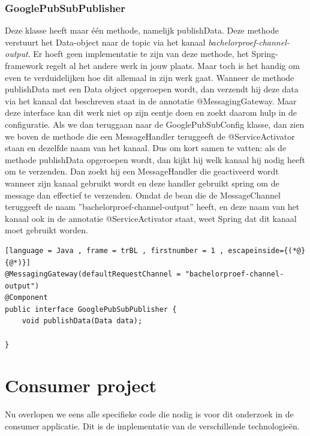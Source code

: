 \subsubsection{GooglePubSubPublisher}
Deze klasse heeft maar één methode, namelijk publishData. Deze methode verstuurt het Data-object naar de topic via het kanaal \emph{bachelorproef-channel-output}. Er hoeft geen implementatie te zijn van deze methode, het Spring-framework regelt al het andere werk in jouw plaats. Maar toch is het handig om even te verduidelijken hoe dit allemaal in zijn werk gaat. Wanneer de methode publishData met een Data object opgeroepen wordt, dan verzendt hij deze data via het kanaal dat beschreven staat in de annotatie @MessagingGateway. Maar deze interface kan dit werk niet op zijn eentje doen en zoekt daarom hulp in de configuratie. Als we dan teruggaan naar de GooglePubSubConfig klasse, dan zien we boven de methode die een MessageHandler teruggeeft de @ServiceActivator staan en dezelfde naam van het kanaal. Dus om kort samen te vatten: als de methode publishData opgeroepen wordt, dan kijkt hij welk kanaal hij nodig heeft om te verzenden. Dan zoekt hij een MessageHandler die geactiveerd wordt wanneer zijn kanaal gebruikt wordt en deze handler gebruikt spring om de message dan effectief te verzenden. Omdat de bean die de MessageChannel teruggeeft de naam ''bachelorproef-channel-output'' heeft, en deze naam van het kanaal ook in de annotatie @ServiceActivator staat, weet Spring dat dit kanaal moet gebruikt worden.

\begin{lstlisting}[language = Java , frame = trBL , firstnumber = 1 , escapeinside={(*@}{@*)}]
@MessagingGateway(defaultRequestChannel = "bachelorproef-channel-output")
@Component
public interface GooglePubSubPublisher {
    void publishData(Data data);

}
\end{lstlisting}


\section{Consumer project}
Nu overlopen we eens alle specifieke code die nodig is voor dit onderzoek in de consumer applicatie. Dit is de implementatie van de verschillende technologieën.

